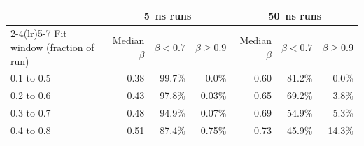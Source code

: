 \begin{tabular}{lrrrrrr}
\toprule
 & \multicolumn{3}{c}{\SI{5}{\nano\second} runs} & \multicolumn{3}{c}{\SI{50}{\nano\second} runs} \\
\cmidrule(lr){2-4}\cmidrule(lr){5-7}
Fit window (fraction of run) & Median $\beta$ & $\beta<0.7$ & $\beta\ge0.9$ & Median $\beta$ & $\beta<0.7$ & $\beta\ge0.9$ \\
\midrule
0.1 to 0.5 & 0.38 & 99.7\% & 0.0\% & 0.60 & 81.2\% & 0.0\% \\
0.2 to 0.6 & 0.43 & 97.8\% & 0.03\% & 0.65 & 69.2\% & 3.8\% \\
0.3 to 0.7 & 0.48 & 94.9\% & 0.07\% & 0.69 & 54.9\% & 5.3\% \\
0.4 to 0.8 & 0.51 & 87.4\% & 0.75\% & 0.73 & 45.9\% & 14.3\% \\
\bottomrule
\end{tabular}

